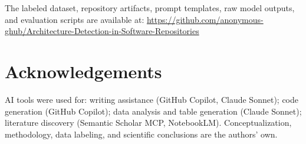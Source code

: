 \documentclass[runningheads]{llncs}
\begin{document}
The labeled dataset, repository artifacts, prompt templates, raw model outputs, and evaluation scripts are available at:
\url{https://github.com/anonymous-ghub/Architecture-Detection-in-Software-Repositories}

\section*{Acknowledgements}

AI tools were used for: writing assistance (GitHub Copilot, Claude Sonnet); code generation (GitHub Copilot); data analysis and table generation (Claude Sonnet); literature discovery (Semantic Scholar MCP, NotebookLM). Conceptualization, methodology, data labeling, and scientific conclusions are the authors' own.



\end{document}
